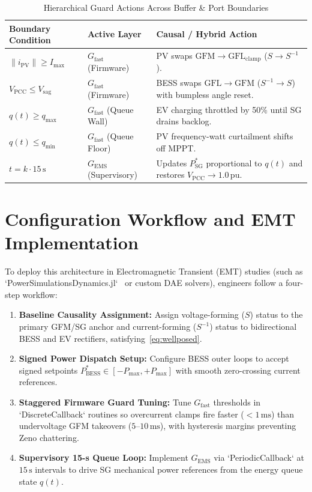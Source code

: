 \documentclass[journal]{IEEEtran}
\begin{document}
\begin{table}[t]
\centering
\caption{Hierarchical Guard Actions Across Buffer \& Port Boundaries}
\label{tab:guards}
\begin{tabular}{@{}p{2.1cm}p{2.5cm}p{3.2cm}@{}}
\toprule
\textbf{Boundary Condition} & \textbf{Active Layer} & \textbf{Causal / Hybrid Action} \\
\midrule
$\|i_{\mathrm{PV}}\| \ge I_{\max}$ & $G_{\mathrm{fast}}$ (Firmware) & PV swaps $\mathrm{GFM} \to \mathrm{GFL}_{\mathrm{clamp}}$ ($S \to S^{-1}$). \\
$V_{\mathrm{PCC}} \le V_{\mathrm{sag}}$ & $G_{\mathrm{fast}}$ (Firmware) & BESS swaps $\mathrm{GFL} \to \mathrm{GFM}$ ($S^{-1} \to S$) with bumpless angle reset. \\
$q(t) \ge q_{\max}$ & $G_{\mathrm{fast}}$ (Queue Wall) & EV charging throttled by 50\% until SG drains backlog. \\
$q(t) \le q_{\min}$ & $G_{\mathrm{fast}}$ (Queue Floor) & PV frequency-watt curtailment shifts off MPPT. \\
$t = k \cdot 15\,\mathrm{s}$ & $G_{\mathrm{EMS}}$ (Supervisory) & Updates $P_{\mathrm{SG}}^*$ proportional to $q(t)$ and restores $V_{\mathrm{PCC}} \to 1.0\,\mathrm{pu}$. \\
\bottomrule
\end{tabular}
\end{table}

\section{Configuration Workflow and EMT Implementation}
To deploy this architecture in Electromagnetic Transient (EMT) studies (such as `PowerSimulationsDynamics.jl`~\cite{Lara2024PSID} or custom DAE solvers), engineers follow a four-step workflow:
\begin{enumerate}
    \item \textbf{Baseline Causality Assignment:} Assign voltage-forming ($S$) status to the primary GFM/SG anchor and current-forming ($S^{-1}$) status to bidirectional BESS and EV rectifiers, satisfying~\eqref{eq:wellposed}.
    \item \textbf{Signed Power Dispatch Setup:} Configure BESS outer loops to accept signed setpoints $P_{\mathrm{BESS}}^* \in [-P_{\max}, +P_{\max}]$ with smooth zero-crossing current references.
    \item \textbf{Staggered Firmware Guard Tuning:} Tune $G_{\mathrm{fast}}$ thresholds in `DiscreteCallback` routines so overcurrent clamps fire faster ($<1\,\mathrm{ms}$) than undervoltage GFM takeovers ($5\text{--}10\,\mathrm{ms}$), with hysteresis margins preventing Zeno chattering.
    \item \textbf{Supervisory 15-s Queue Loop:} Implement $G_{\mathrm{EMS}}$ via `PeriodicCallback` at $15\,\mathrm{s}$ intervals to drive SG mechanical power references from the energy queue state $q(t)$.
\end{enumerate}
\end{document}

